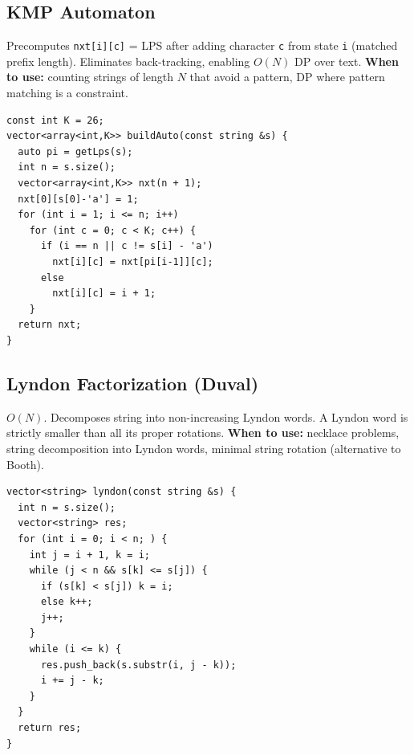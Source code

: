 \subsection{KMP Automaton}
Precomputes \texttt{nxt[i][c]} = LPS after adding character \texttt{c} from state \texttt{i} (matched prefix length).
Eliminates back-tracking, enabling $O(N)$ DP over text.
\textbf{When to use:} counting strings of length $N$ that avoid a pattern, DP where pattern matching is a constraint.
\begin{verbatim}
const int K = 26;
vector<array<int,K>> buildAuto(const string &s) {
  auto pi = getLps(s);
  int n = s.size();
  vector<array<int,K>> nxt(n + 1);
  nxt[0][s[0]-'a'] = 1;
  for (int i = 1; i <= n; i++)
    for (int c = 0; c < K; c++) {
      if (i == n || c != s[i] - 'a')
        nxt[i][c] = nxt[pi[i-1]][c];
      else
        nxt[i][c] = i + 1;
    }
  return nxt;
}
\end{verbatim}
\subsection{Lyndon Factorization (Duval)}
$O(N)$. Decomposes string into non-increasing Lyndon words. A Lyndon word is strictly smaller than all its proper rotations.
\textbf{When to use:} necklace problems, string decomposition into Lyndon words, minimal string rotation (alternative to Booth).
\begin{verbatim}
vector<string> lyndon(const string &s) {
  int n = s.size();
  vector<string> res;
  for (int i = 0; i < n; ) {
    int j = i + 1, k = i;
    while (j < n && s[k] <= s[j]) {
      if (s[k] < s[j]) k = i;
      else k++;
      j++;
    }
    while (i <= k) {
      res.push_back(s.substr(i, j - k));
      i += j - k;
    }
  }
  return res;
}
\end{verbatim}
